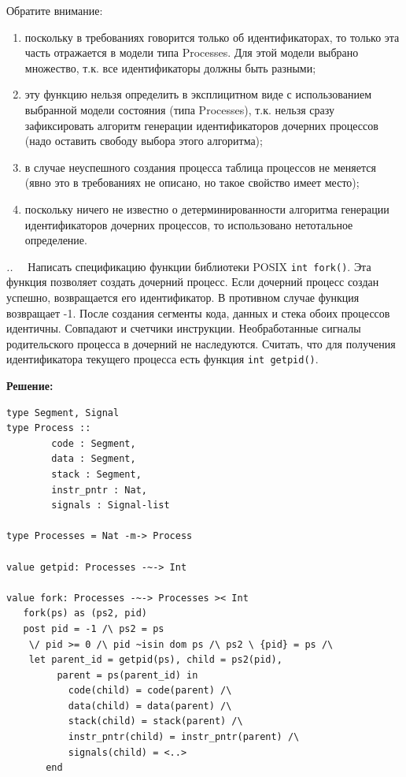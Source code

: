 \documentclass[14pt, twoside]{extreport}
\newcounter{problem_type}[chapter]
\newcounter{zadacha}[problem_type]
\newcommand{\z}{\vspace{0.5cm}\par\addtocounter{zadacha}{1}%
\textit{\arabic{chapter}.\arabic{problem_type}.\arabic{zadacha}}~~  }
\begin{document}
Обратите внимание:
\begin{enumerate}
  \item поскольку в требованиях говорится только об идентификаторах, то только эта часть отражается в модели типа Processes. Для этой модели выбрано множество, т.к. все идентификаторы должны быть разными;
  \item эту функцию нельзя определить в эксплицитном виде с использованием выбранной модели состояния (типа Processes), т.к. нельзя сразу зафиксировать алгоритм генерации идентификаторов дочерних процессов (надо оставить свободу выбора этого алгоритма);
  \item в случае неуспешного создания процесса таблица процессов не меняется (явно это в требованиях не описано, но такое свойство имеет место);
  \item поскольку ничего не известно о детерминированности алгоритма генерации идентификаторов дочерних процессов, то использовано нетотальное определение.
\end{enumerate}

\z Написать спецификацию функции библиотеки POSIX \texttt{int fork()}. Эта функция позволяет создать дочерний процесс. Если дочерний процесс создан успешно, возвращается его идентификатор. В противном случае функция возвращает -1. После создания сегменты кода, данных и стека обоих процессов идентичны. Совпадают и счетчики инструкции. Необработанные сигналы родительского процесса в дочерний не наследуются. Считать, что для получения идентификатора текущего процесса есть функция \texttt{int getpid()}.

\textbf{Решение:}
\begin{lstlisting}
type Segment, Signal
type Process ::
		code : Segment,
		data : Segment,
		stack : Segment,
		instr_pntr : Nat,
		signals : Signal-list

type Processes = Nat -m-> Process

value getpid: Processes -~-> Int

value fork: Processes -~-> Processes >< Int
   fork(ps) as (ps2, pid)
   post pid = -1 /\ ps2 = ps
   	\/ pid >= 0 /\ pid ~isin dom ps /\ ps2 \ {pid} = ps /\
	let parent_id = getpid(ps), child = ps2(pid),
	     parent = ps(parent_id) in
   	       code(child) = code(parent) /\
   	       data(child) = data(parent) /\
   	       stack(child) = stack(parent) /\
   	       instr_pntr(child) = instr_pntr(parent) /\
   	       signals(child) = <..>
   	   end
\end{lstlisting}
\end{document}
